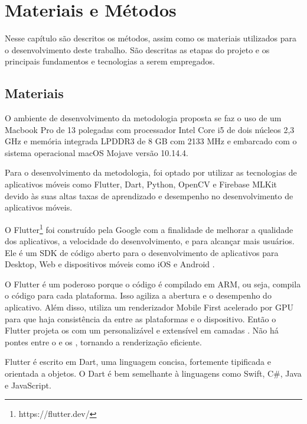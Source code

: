 \chapter{Materiais e Métodos} \label{cap:metod}

Nesse capítulo são descritos os métodos, assim como os materiais utilizados para o desenvolvimento deste trabalho. São descritas as etapas do projeto e os principais fundamentos e tecnologias a serem empregados.


\section{Materiais}
O ambiente de desenvolvimento da metodologia proposta se faz o uso de um Macbook Pro de 13 polegadas com processador Intel Core i5 de dois núcleos 2,3 GHz e memória integrada LPDDR3 de 8 GB com 2133 MHz e embarcado com o sistema operacional macOS Mojave versão 10.14.4.  

Para o desenvolvimento da metodologia, foi optado por utilizar as tecnologias de aplicativos móveis como Flutter, Dart, Python, OpenCV e Firebase MLKit devido às suas altas taxas de aprendizado e desempenho no desenvolvimento de aplicativos móveis.

O Flutter\footnote{https://flutter.dev/} foi construído pela Google com a finalidade de melhorar a qualidade dos aplicativos, a velocidade do desenvolvimento, e para alcançar mais usuários. Ele é um SDK  de código aberto para o desenvolvimento de aplicativos para Desktop, Web e dispositivos móveis como iOS e Android \cite{ARSTECHNICA2017}.


O Flutter é um poderoso  porque o código é compilado em ARM, ou seja, compila o código para cada plataforma. Isso agiliza a abertura e o desempenho do aplicativo. Além disso, utiliza um renderizador Mobile First acelerado por GPU para que haja consistência da  entre as plataformas e o dispositivo. Então o Flutter projeta os  com um  personalizável e extensível em camadas \cite{IMASTERS}. Não há pontes entre o  e os , tornando a renderização eficiente. 

Flutter é escrito em Dart, uma linguagem concisa, fortemente tipificada e orientada a objetos. O Dart é bem semelhante à linguagens como Swift, C#, Java e JavaScript.

